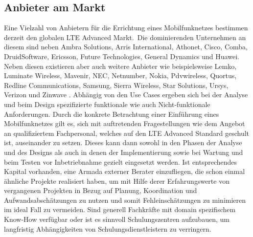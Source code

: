 	\subsection{Anbieter am Markt}
	\label{subsec:Anbieter am Markt}
	Eine Vielzahl von Anbietern für die Errichtung eines Mobilfunknetzes bestimmen derzeit den globalen LTE Advanced Markt.\ Die dominierenden Unternehmen an diesem sind neben Ambra Solutions, Arris International,
	Athonet, Cisco, Comba, DruidSoftware, Ericsson, Future Technologies, General Dynamics und 
	Huawei. Neben diesen existieren aber auch weitere Anbieter wie beispielsweise Lemko, Luminate Wireless,
	Mavenir,
	NEC,
	Netnumber,
	Nokia,
	Pdvwireless,
	Quortus,
	Redline Communications,
	Samsung,
	Sierra Wireless,
	Star Solutions,
	Ursys,
	Verizon und 
	Zinwave \cite{Max19}.
	Abhängig von den Use Cases ergeben sich bei der Analyse und beim Design spezifizierte funktionale wie auch Nicht-funktionale Anforderungen. Durch die konkrete Betrachtung einer Einführung eines Mobilfunknetzes gilt es, sich mit auftretenden Fragestellungen wie  dem Angebot an qualifiziertem Fachpersonal, welches auf den LTE Advanced Standard geschult ist, auseinander zu setzen. Dieses kann dann sowohl in den Phasen der Analyse und des Designs als auch in denen der Implementierung sowie bei Wartung und beim Testen vor Inbetriebnahme gezielt eingesetzt werden. Ist entsprechendes Kapital vorhanden, eine Armada externer Berater einzufliegen, die schon einmal ähnliche Projekte realisiert haben, um mit Hilfe derer Erfahrungswerte von vergangenen Projekten in Bezug auf Planung, Koordination und Aufwandsabschätzungen zu nutzen und somit Fehleinschätzungen zu minimieren im ideal Fall zu vermeiden. Sind generell Fachkräfte mit domain spezifischem Know-How verfügbar oder ist es sinnvoll Schulungszentren aufzubauen, um langfristig Abhängigkeiten von Schulungsdienstleistern zu verringern.
